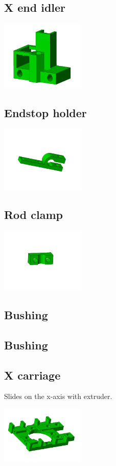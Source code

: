 \documentclass[11pt]{article}
\begin{document}
\subsection{X end idler}


\includegraphics[width=4cm]{images/x-end-idler.jpg}
\subsection{Endstop holder}


\includegraphics[width=4cm]{images/endstop-holder.jpg}
\subsection{Rod clamp}


\includegraphics[width=4cm]{images/rod-clamp.jpg}
\subsection{Bushing}


\subsection{Bushing}


\subsection{X carriage}
Slides on the x-axis with extruder.

\includegraphics[width=4cm]{images/x-carriage.jpg}
\end{document}
